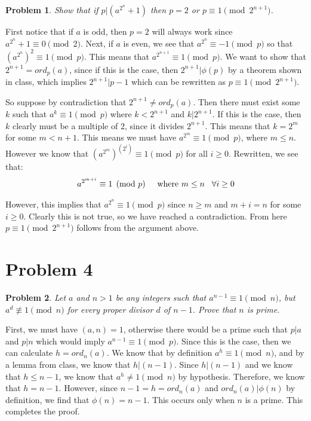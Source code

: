 \documentclass[psamsfonts]{amsart}
\newtheorem{prob}{Problem}[section]
\newenvironment{sol}{{\bfseries Solution}}{\qedsymbol}
\theoremstyle{definition}
\theoremstyle{remark}
\numberwithin{equation}{section}
\begin{document}
\begin{prob}
Show that if $p|(a^{2^{n}} + 1)$ then $p = 2$ or $p \equiv 1 \pmod{2^{n+1}}$. 
\end{prob}

\begin{sol}
First notice that if $a$ is odd, then $p = 2$ will always work since $a^{2^n} + 1 \equiv 0 \pmod{2}$. Next, if $a$ is even, we see that $a^{2^n} \equiv -1 \pmod{p}$ so that $(a^{2^n})^{2} \equiv 1 \pmod{p}$. This means that $a^{2^{n+1}} \equiv 1 \pmod{p}$. We want to show that $2^{n+1} = ord_p(a)$, since if this is the case, then $2^{n+1} | \phi(p)$ by a theorem shown in class, which implies $2^{n+1} | p - 1$ which can be rewritten as $p \equiv 1 \pmod{2^{n+1}}$. 

So suppose by contradiction that $2^{n+1} \neq ord_p(a)$. Then there must exist some $k$ such that $a^k \equiv 1 \pmod{p}$ where $k < 2^{n+1}$ and $k | 2^{n+1}$. If this is the case, then $k$ clearly must be a multiple of 2, since it divides $2^{n+1}$. This means that $k = 2^{m}$ for some $m < n+1$. This means we must have $a^{2^m} \equiv 1 \pmod{p}$, where $m \leq n$. However we know that $(a^{2^m})^{(2^i)} \equiv 1 \pmod{p}$ for all $i \geq 0$. Rewritten, we see that:
\begin{eqnarray}
a^{2^{m + i}} \equiv 1 \pmod{p} \hspace{0.5cm} \text{where } m \leq n \hspace{0.3cm} \forall i \geq 0
\end{eqnarray}

However, this implies that $a^{2^n} \equiv 1 \pmod{p}$ since $n \geq m$ and $m + i = n$ for some $i \geq 0$. Clearly this is not true, so we have reached a contradiction. From here $p \equiv 1 \pmod{2^{n+1}}$ follows from the argument above.
\end{sol}

\section{Problem 4}

\begin{prob}
Let $a$ and $n > 1$ be any integers such that $a^{n-1} \equiv 1 \pmod{n}$, but $a^{d} \not \equiv 1 \pmod{n}$ for every proper divisor $d$ of $n - 1$. Prove that $n$ is prime.
\end{prob}

\begin{sol}
First, we must have $(a,n) = 1$, otherwise there would be a prime such that $p|a$ and $p|n$ which would imply $a^{n-1} \equiv 1 \pmod{p}$. Since this is the case, then we can calculate $h = ord_n(a)$. We know that by definition $a^{h} \equiv 1 \pmod{n}$, and by a lemma from class, we know that $h | (n-1)$. Since $h | (n-1)$ and we know that $ h \leq n - 1$, we know that $a^{h} \neq 1 \pmod{n}$ by hypothesis. Therefore, we know that $h = n -1$. However, since $n - 1 = h = ord_n(a)$ and $ord_n(a) | \phi(n)$ by definition, we find that $\phi(n) = n - 1$. This occurs only when $n$ is a prime. This completes the proof.
\end{sol}
\end{document}
